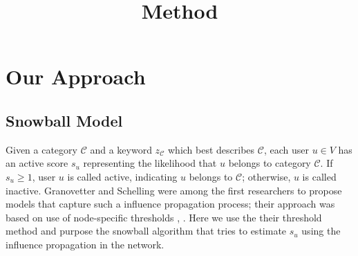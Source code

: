 \documentclass{article}
\begin{document}
\title{Method}

\newcommand{\following}{\ensuremath{following}}
\newcommand{\follower}{\ensuremath{follower}}

\maketitle \else \fi

\section{Our Approach}\label{sec:method}

\subsection{Snowball Model}

Given a category $\mathcal{C}$ and a keyword $z_{\mathcal{C}}$ which best describes $\mathcal{C}$, each user $u \in V$ has an active score $s_u$ representing the likelihood that $u$ belongs to category $\mathcal{C}$. If $s_u \geq 1$, user $u$ is called active, indicating $u$ belongs to $\mathcal{C}$; otherwise, $u$ is called inactive. Granovetter and Schelling were among the first researchers to propose models that capture such a influence propagation process; their approach was based on use of node-specific thresholds \cite{snowball1}, \cite{snowball2}. Here we use the their threshold method and purpose the snowball algorithm that tries to estimate $s_u$ using the influence propagation in the network.

\end{document}
